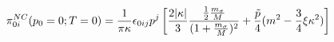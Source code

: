 \begin{equation}\label{res0}
{\cal{\pi}}_{0i}^{NC} (p_0=0;T=0) = \frac{1}{\pi \kappa} \epsilon_{0ij} p^j
\left[\frac{2 |\kappa|}{3} \frac{ \frac{1}{2}
\frac{m_{\sigma}}{M}}{(1 + \frac{m_{\sigma}}{M})^2} +
\frac{\tilde{p}}{4} (m^2 - \frac{3}{4}\xi \kappa^2)\right]
\end{equation}

